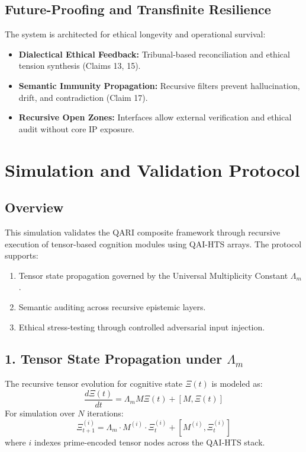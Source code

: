 \documentclass[12pt]{article}
\begin{document}
\subsection{Future-Proofing and Transfinite Resilience}

The system is architected for ethical longevity and operational survival:

\begin{itemize}
    \item \textbf{Dialectical Ethical Feedback:} Tribunal-based reconciliation and ethical tension synthesis (Claims 13, 15).

    \item \textbf{Semantic Immunity Propagation:} Recursive filters prevent hallucination, drift, and contradiction (Claim 17).

    \item \textbf{Recursive Open Zones:} Interfaces allow external verification and ethical audit without core IP exposure.
\end{itemize}

\section{Simulation and Validation Protocol}

\subsection{Overview}

This simulation validates the QARI composite framework through recursive execution of tensor-based cognition modules using QAI-HTS arrays. The protocol supports:
\begin{enumerate}
    \item Tensor state propagation governed by the Universal Multiplicity Constant $\Lambda_m$.
    \item Semantic auditing across recursive epistemic layers.
    \item Ethical stress-testing through controlled adversarial input injection.
\end{enumerate}

\subsection{1. Tensor State Propagation under $\Lambda_m$}

The recursive tensor evolution for cognitive state $\Xi(t)$ is modeled as:
\begin{equation}
\frac{d\Xi(t)}{dt} = \Lambda_m M \Xi(t) + [M, \Xi(t)]
\end{equation}
For simulation over $N$ iterations:
\begin{equation}
\Xi_{t+1}^{(i)} = \Lambda_m \cdot M^{(i)} \cdot \Xi_t^{(i)} + \left[M^{(i)}, \Xi_t^{(i)}\right]
\end{equation}
where $i$ indexes prime-encoded tensor nodes across the QAI-HTS stack.
\end{document}
